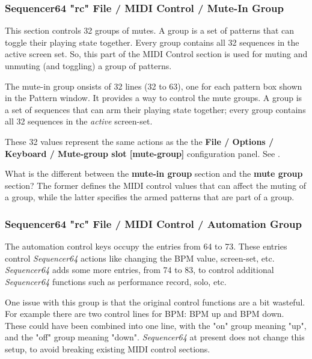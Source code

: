 \subsubsection{Sequencer64 "rc" File / MIDI Control / Mute-In Group}
\label{subsubsec:seq64_rc_file_midi_ctrl_mutein}

   This section controls 32 groups of mutes.
   A group is a set of patterns that can toggle their playing state
   together.  Every group contains all 32 sequences in the active screen set.
   So, this part of the MIDI Control section is used for muting and unmuting
   (and toggling) a group of patterns.

   The mute-in group onsists of 32 lines (32 to 63), one for each
   pattern box shown in the Pattern window.
   It provides a way to control the mute groups.
   A group is a set of sequences that can arm their playing state
   together; every group contains all 32 sequences in the
   \textsl{active} screen-set.

   These 32 values represent the same actions as the
   the \textbf{File / Options / Keyboard / Mute-group slot [mute-group]} 
   configuration panel.
   See .

   What is the different between the \textbf{mute-in group}
   section and the \textbf{mute group} section?  The former defines the MIDI
   control values that can affect the muting of a group, while the latter
   specifies the armed patterns that are part of a group.

\subsubsection{Sequencer64 "rc" File / MIDI Control / Automation Group}
\label{subsubsec:seq64_rc_file_midi_ctrl_automation}

   The automation control keys occupy the entries from 64 to 73.
   These entries control
   \textsl{Sequencer64} actions like changing the BPM value, screen-set, etc.
   \textsl{Sequencer64} adds some more entries, from 74 to 83, to control
   additional \textsl{Sequencer64} functions such as performance
   record, solo, etc.
   
   One issue with this group is that the original control functions are a bit
   wasteful.  For example there are two control lines for BPM:  BPM up and BPM
   down.  These could have been combined into one line, with the "on" group
   meaning "up", and the "off" group meaning "down".  
   \textsl{Sequencer64} at present does not change this setup, to avoid
   breaking existing MIDI control sections.

